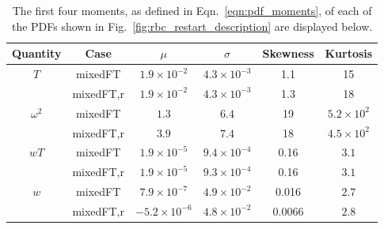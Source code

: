 \documentclass[aps, pre, onecolumn, nofootinbib, notitlepage, groupedaddress, amsfonts, amssymb, amsmath, longbibliography]{revtex4-1}
\begin{document}
\begin{table}[t!]
\caption{ 
	The first four moments, as defined in Eqn.~\ref{eqn:pdf_moments}, of each of the PDFs shown in Fig.~\ref{fig:rbc_restart_description} are displayed below.
}
\setlength{\tabcolsep}{12pt}
\label{table:pdf_values}
\begin{center}
\begin{tabularx}{\textwidth}{c c c c c c}
\hline																	
Quantity &	Case	&	$\mu$	&	$\sigma$	&	Skewness	&	Kurtosis \\
\hline
$T$				&	mixedFT		&		$1.9 \times 10^{-2}$	&	$4.3 \times 10^{-3}$	&	1.1		&	15 \\
				&	mixedFT,r	&		$1.9 \times 10^{-2}$	&	$4.3 \times 10^{-3}$	&	1.3		&	18 \\
\hline
$\omega^2$		&	mixedFT		&		$1.3$					&	$6.4$					&	19		&	$5.2 \times 10^2$ \\
				&	mixedFT,r	&		$3.9$					&	$7.4$					&	18		&	$4.5 \times 10^2$ \\
\hline
$wT$			&	mixedFT		&		$1.9 \times 10^{-5}$	&	$9.4 \times 10^{-4}$	&	0.16	&	$3.1$ \\
				&	mixedFT,r	&		$1.9 \times 10^{-5}$	&	$9.3 \times 10^{-4}$	&	0.16	&	$3.1$ \\
\hline
$w$				&	mixedFT		&		$7.9 \times 10^{-7}$	&	$4.9 \times 10^{-2}$	&	0.016	&	$2.7$ \\
				&	mixedFT,r	&		$-5.2 \times 10^{-6}$	&	$4.8 \times 10^{-2}$	&	0.0066	&	$2.8$ \\
\hline																	
\end{tabularx}
\end{center}
\end{table}
\end{document}
